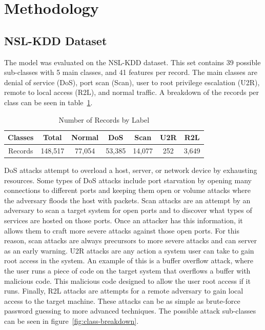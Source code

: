 \documentclass{article}
\begin{document}
\section{Methodology}

\subsection{NSL-KDD Dataset}

The model was evaluated on the NSL-KDD dataset. This set contains 39 possible sub-classes with 5 main classes, and 41 features per record. The main classes are denial of service (DoS), port scan (Scan), user to root privilege escalation (U2R), remote to local access (R2L), and normal traffic. A breakdown of the records per class can be seen in table~\ref{tab:record-count}.

\begin{table}[h]
\centering
\begin{tabular}{ c|c|c|c|c|c|c }
  Classes & Total & Normal & DoS & Scan & U2R & R2L \\
  \hline
  Records & 148,517 & 77,054 & 53,385 & 14,077 & 252 & 3,649 \\
\end{tabular}
\caption{Number of Records by Label}
\label{tab:record-count}
\end{table}

DoS attacks attempt to overload a host, server, or network device by exhausting resources. Some types of DoS attacks include port starvation by opening many connections to different ports and keeping them open or volume attacks where the adversary floods the host with packets. Scan attacks are an attempt by an adversary to scan a target system for open ports and to discover what types of services are hosted on those ports. Once an attacker has this information, it allows them to craft more severe attacks against those open ports. For this reason, scan attacks are always precursors to more severe attacks and can server as an early warning. U2R attacks are any action a system user can take to gain root access in the system. An example of this is a buffer overflow attack, where the user runs a piece of code on the target system that overflows a buffer with malicious code. This malicious code designed to allow the user root access if it runs. Finally, R2L attacks are attempts for a remote adversary to gain local access to the target machine. These attacks can be as simple as brute-force password guessing to more advanced techniques. The possible attack sub-classes can be seen in figure~\ref{fig:class-breakdown}.
\end{document}
